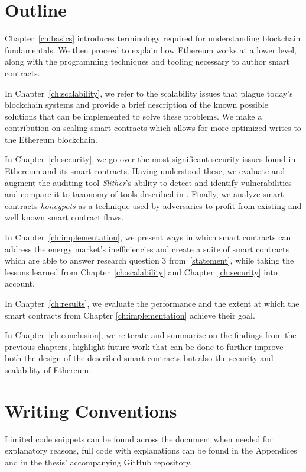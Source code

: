 \section{Outline}

Chapter~\ref{ch:basics} introduces terminology required for understanding blockchain fundamentals. We then proceed to explain how Ethereum works at a lower level, along with the programming techniques and tooling necessary to author smart contracts.

In Chapter~\ref{ch:scalability}, we refer to the scalability issues that plague today's blockchain systems and provide a brief description of the known possible solutions that can be implemented to solve these problems. We make a contribution on scaling smart contracts which allows for more optimized writes to the Ethereum blockchain.

In Chapter~\ref{ch:security}, we go over the most significant security issues found in Ethereum and its smart contracts. Having understood these, we evaluate and augment the auditing tool \textit{Slither}'s ability to detect and identify vulnerabilities and compare it to taxonomy of tools described in \cite{tools}. Finally, we analyze smart contracts \textit{honeypots} as a technique used by adversaries to profit from existing and well known smart contract flaws.

In Chapter~\ref{ch:implementation}, we present ways in which smart contracts can address the energy market's inefficiencies and create a suite of smart contracts which are able to answer research question 3 from~\ref{statement}, while taking the lessons learned from Chapter~\ref{ch:scalability} and Chapter~\ref{ch:security} into account.

In Chapter~\ref{ch:results}, we evaluate the performance and the extent at which the smart contracts from Chapter \ref{ch:implementation} achieve their goal. 

In Chapter~\ref{ch:conclusion}, we reiterate and summarize on the findings from the previous chapters, highlight future work that can be done to further improve both the design of the described smart contracts but also the security and scalability of Ethereum.

\section{Writing Conventions}
Limited code snippets can be found across the document when needed for explanatory reasons, full code with explanations can be found in the Appendices and in the thesis' accompanying GitHub repository\@.